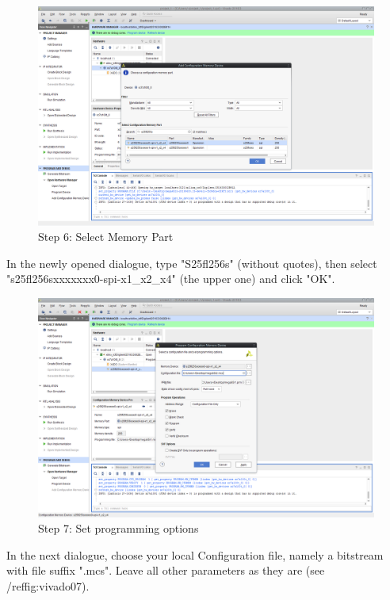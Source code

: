 \begin{figure}
  \includegraphics[width=\linewidth]{images/vivado06.png}
  \caption{Step 6: Select Memory Part}
  \label{fig:vivado06}
\end{figure}

In the newly opened dialogue, type "S25fl256s" (without quotes), then select "s25fl256sxxxxxxx0-spi-x1_x2_x4" (the upper one) and click "OK".

\begin{figure}
  \includegraphics[width=\linewidth]{images/vivado07.png}
  \caption{Step 7: Set programming options}
  \label{fig:vivado07}
\end{figure}

In the next dialogue, choose your local Configuration file, namely a bitstream with file suffix ".mcs". Leave all other parameters as they are (see /ref{fig:vivado07}).

